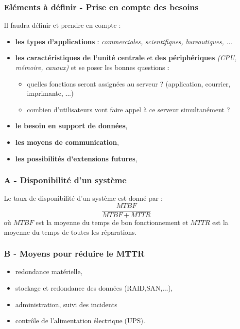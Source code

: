 \documentclass[10pt,a4paper,oneside,titlepage]{report}
\begin{document}
\begin{sffamily}
\subsubsection{Eléments à définir - Prise en compte des besoins}

Il faudra définir et prendre en compte : 
\begin{itemize}
\item \textbf{les types d'applications} : \textit{commerciales, scientifiques, bureautiques, ...}
\item \textbf{les caractéristiques de l'unité centrale} et \textbf{des périphériques} \textit{(CPU, mémoire, canaux)} et se poser les bonnes questions :
\begin{itemize}
\item quelles fonctions seront assignées au serveur ? (application, courrier, imprimante, ...)
\item combien d'utilisateurs vont faire appel à ce serveur simultanément ?
\end{itemize}
\item \textbf{le besoin en support de données},
\item \textbf{les moyens de communication},
\item \textbf{les possibilités d'extensions futures},
\end{itemize}

\subsubsection{A - Disponibilité d'un système}

Le taux de disponibilité d'un système est donné par : $$\frac{MTBF}{MTBF+MTTR}$$ où $MTBF$ est la moyenne du temps de bon fonctionnement et $MTTR$ est la moyenne du temps de toutes les réparations.

\subsubsection{B - Moyens pour réduire le MTTR}

\begin{itemize}
\item redondance matérielle,
\item stockage et redondance des données (RAID,SAN,...),
\item administration, suivi des incidents
\item contr\^ole de l'alimentation électrique (UPS).
\end{itemize}


\end{sffamily}
\end{document}
